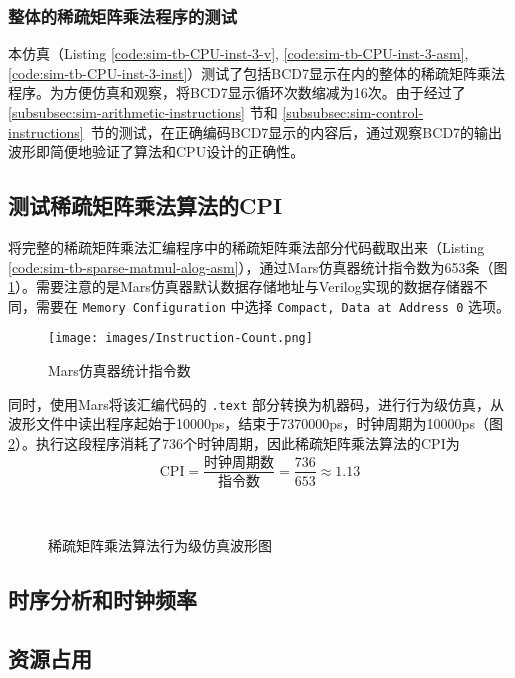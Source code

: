 \subsubsection{整体的稀疏矩阵乘法程序的测试}
本仿真（Listing \ref{code:sim-tb-CPU-inst-3-v}, \ref{code:sim-tb-CPU-inst-3-asm}, \ref{code:sim-tb-CPU-inst-3-inst}）测试了包括BCD7显示在内的整体的稀疏矩阵乘法程序。为方便仿真和观察，将BCD7显示循环次数缩减为16次。由于经过了 \ref{subsubsec:sim-arithmetic-instructions} 节和 \ref{subsubsec:sim-control-instructions}\ 节的测试，在正确编码BCD7显示的内容后，通过观察BCD7的输出波形即简便地验证了算法和CPU设计的正确性。


\subsection{测试稀疏矩阵乘法算法的CPI}
将完整的稀疏矩阵乘法汇编程序中的稀疏矩阵乘法部分代码截取出来（Listing \ref{code:sim-tb-sparse-matmul-alog-asm}），通过Mars仿真器统计指令数为653条（图 \ref{fig:instruction-count}）。需要注意的是Mars仿真器默认数据存储地址与Verilog实现的数据存储器不同，需要在 \lstinline|Memory Configuration| 中选择 \lstinline|Compact, Data at Address 0| 选项。
\begin{figure}[H]
    \centering
    \texttt{[image: images/Instruction-Count.png]}
    \vspace{-2em}
    \caption{Mars仿真器统计指令数}
    \label{fig:instruction-count}
\end{figure}
同时，使用Mars将该汇编代码的 \lstinline|.text| 部分转换为机器码，进行行为级仿真，从波形文件中读出程序起始于10000ps，结束于7370000ps，时钟周期为10000ps（图 \ref{fig:simulation-time}）。执行这段程序消耗了736个时钟周期，因此稀疏矩阵乘法算法的CPI为
\begin{equation}
    \text{CPI} = \frac{\text{时钟周期数}}{\text{指令数}} = \frac{736}{653} \approx 1.13
\end{equation}
\begin{figure}[H]
    \centering
    \\
    \vspace{-1em}
    \caption{稀疏矩阵乘法算法行为级仿真波形图}
    \label{fig:simulation-time}
\end{figure}

\subsection{时序分析和时钟频率}

\subsection{资源占用}
